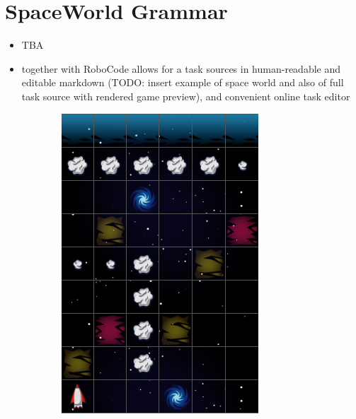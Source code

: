 \section{SpaceWorld Grammar}

\begin{itemize}
\item TBA
\item together with RoboCode allows for a task sources in human-readable and editable markdown (TODO: insert example of space world and also of full task source with rendered game preview), and convenient online task editor
\end{itemize}


\begin{figure}[h]
\begin{center}
\begin{subfigure}{.4\textwidth}
\centering
\includegraphics[width=.9\textwidth]{img/spaceworld}
\end{subfigure}

\end{center}
\end{figure}
